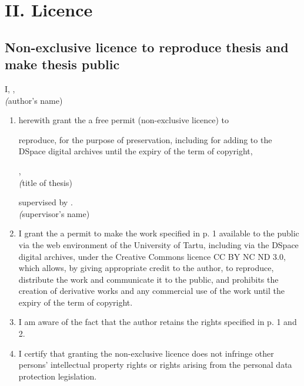 
\newpage

\newcommand{\licencehint}[2]{\\\hspace*{#1}\textsl(#2)\par}
\section*{II. Licence}


\subsection*{Non-exclusive licence to reproduce thesis and make thesis public}

I, \textbf{{\thesisAuthor}}, %
\licencehint{10mm}{author's name}

\begin{enumerate}
  \item
  herewith grant the {\thesisUniversity} a free permit (non-exclusive licence) to
  \par
  reproduce, for the purpose of preservation, including for adding to the DSpace digital archives until the expiry of the term of copyright,
  \par
  \textbf{{\thesisTitle}}, %
  \licencehint{10mm}{title of thesis}
  \par
  supervised by {\thesisSupervisor}. %
  \licencehint{10mm}{supervisor's name}
  \item
  I grant the {\thesisUniversity} a permit to make the work specified in p. 1 available to the public via the web environment of the University of Tartu, including via the DSpace digital archives, under the Creative Commons licence CC BY NC ND 3.0, which allows, by giving appropriate credit to the author, to reproduce, distribute the work and communicate it to the public, and prohibits the creation of derivative works and any commercial use of the work until the expiry of the term of copyright.
  \item
  I am aware of the fact that the author retains the rights specified in p. 1 and 2.
  \item
  I certify that granting the non-exclusive licence does not infringe other persons' intellectual property rights or rights arising from the personal data protection legislation.
\end{enumerate}

\noindent
{\thesisAuthor}\\ %
\textbf{\textsl{{\todayDate}}}
